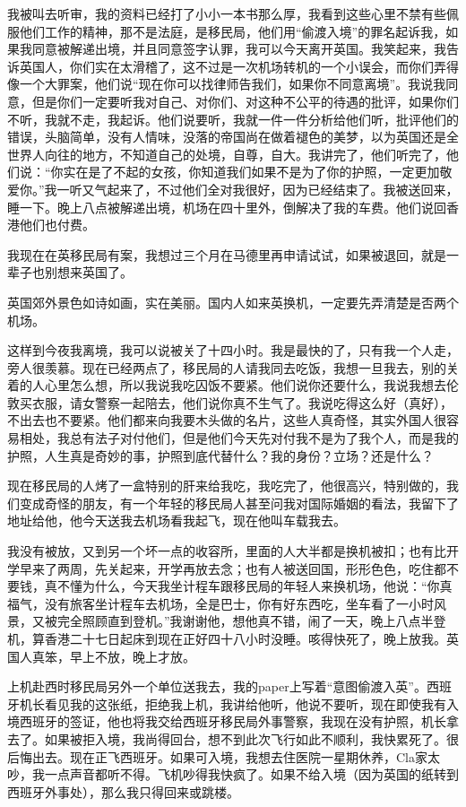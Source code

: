 \par 我被叫去听审，我的资料已经打了小小一本书那么厚，我看到这些心里不禁有些佩服他们工作的精神，那不是法庭，是移民局，他们用“偷渡入境”的罪名起诉我，如果我同意被解递出境，并且同意签字认罪，我可以今天离开英国。我笑起来，我告诉英国人，你们实在太滑稽了，这不过是一次机场转机的一个小误会，而你们弄得像一个大罪案，他们说“现在你可以找律师告我们，如果你不同意离境”。我说我同意，但是你们一定要听我对自己、对你们、对这种不公平的待遇的批评，如果你们不听，我就不走，我起诉。他们说要听，我就一件一件分析给他们听，批评他们的错误，头脑简单，没有人情味，没落的帝国尚在做着褪色的美梦，以为英国还是全世界人向往的地方，不知道自己的处境，自尊，自大。我讲完了，他们听完了，他们说：“你实在是了不起的女孩，你知道我们如果不是为了你的护照，一定更加敬爱你。”我一听又气起来了，不过他们全对我很好，因为已经结束了。我被送回来，睡一下。晚上八点被解递出境，机场在四十里外，倒解决了我的车费。他们说回香港他们也付费。
\par 我现在在英移民局有案，我想过三个月在马德里再申请试试，如果被退回，就是一辈子也别想来英国了。
\par 英国郊外景色如诗如画，实在美丽。国内人如来英换机，一定要先弄清楚是否两个机场。
\par 这样到今夜我离境，我可以说被关了十四小时。我是最快的了，只有我一个人走，旁人很羡慕。现在已经两点了，移民局的人请我同去吃饭，我想一旦我去，别的关着的人心里怎么想，所以我说我吃囚饭不要紧。他们说你还要什么，我说我想去伦敦买衣服，请女警察一起陪去，他们说你真不生气了。我说吃得这么好（真好），不出去也不要紧。他们都来向我要木头做的名片，这些人真奇怪，其实外国人很容易相处，我总有法子对付他们，但是他们今天先对付我不是为了我个人，而是我的护照，人生真是奇妙的事，护照到底代替什么？我的身份？立场？还是什么？
\par 现在移民局的人烤了一盒特别的肝来给我吃，我吃完了，他很高兴，特别做的，我们变成奇怪的朋友，有一个年轻的移民局人甚至问我对国际婚姻的看法，我留下了地址给他，他今天送我去机场看我起飞，现在他叫车载我去。
\par 我没有被放，又到另一个坏一点的收容所，里面的人大半都是换机被扣；也有比开学早来了两周，先关起来，开学再放去念；也有人被送回国，形形色色，吃住都不要钱，真不懂为什么，今天我坐计程车跟移民局的年轻人来换机场，他说：“你真福气，没有旅客坐计程车去机场，全是巴士，你有好东西吃，坐车看了一小时风景，又被完全照顾直到登机。”我谢谢他，想他真不错，闹了一天，晚上八点半登机，算香港二十七日起床到现在正好四十八小时没睡。咳得快死了，晚上放我。英国人真笨，早上不放，晚上才放。
\par 上机赴西时移民局另外一个单位送我去，我的paper上写着“意图偷渡入英”。西班牙机长看见我的这张纸，拒绝我上机，我讲给他听，他说不要听，现在即使我有入境西班牙的签证，他也将我交给西班牙移民局外事警察，我现在没有护照，机长拿去了。如果被拒入境，我尚得回台，想不到此次飞行如此不顺利，我快累死了。很后悔出去。现在正飞西班牙。如果可入境，我想去住医院一星期休养，Cla家太吵，我一点声音都听不得。飞机吵得我快疯了。如果不给入境（因为英国的纸转到西班牙外事处），那么我只得回来或跳楼。
